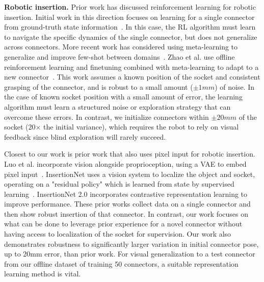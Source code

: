 \textbf{Robotic insertion.} Prior work has discussed reinforcement learning for robotic insertion.
Initial work in this direction focuses on learning
for a single connector from ground-truth state information~\cite{lian2021insertionbenchmark, johannink18residualrl, schoettler2019insertion}.
In this case, the RL algorithm must learn to navigate the specific dynamics of the single connector, but does not generalize across connectors.
More recent work has considered using meta-learning to generalize and improve few-shot between domains~\cite{Schoettler2020}.
Zhao et al. use offline reinforcement learning and finetuning combined with  meta-learning to adapt to a new connector~\cite{zhao2022insertion}.
This work assumes a known position of the socket and consistent grasping of the connector, and is robust to a small amount ($\pm1mm$) of noise.
In the case of known socket position with a small amount of error, the learning algorithm must learn a structured noise or exploration strategy that can overcome these errors.
In contrast, we initialize connectors within $\pm20mm$ of the socket (20$\times$ the initial variance), which requires the robot to rely on visual feedback since blind exploration will rarely succeed.

Closest to our work is prior work that also uses pixel input for robotic insertion.
Luo et al. incorporate vision alongside proprioception, using a VAE to embed pixel input~\cite{luo2021insertion}.
InsertionNet uses a vision system to localize the object and socket, operating on a "residual policy" which is learned from state by supervised learning~\cite{spector2021insertionnet}.
InsertionNet 2.0 incorporates contrastive representation learning to improve performance.
These prior works collect data on a single connector and then show robust insertion of that connector.
In contrast, our work focuses on what can be done to leverage prior experience for a novel connector without having access to localization of the socket for supervision.
Our work also demonstrates robustness to significantly larger variation in initial connector pose, up to 20mm error, than prior work.
For visual generalization to a test connector from our offline dataset of training 50 connectors, a suitable representation learning method is vital.


